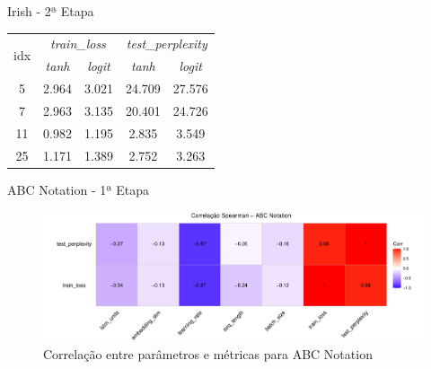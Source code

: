 \documentclass[xcolor=table]{beamer}
\begin{document}
    \begin{frame}{Irish - 2ª Etapa}
        \large
        \begin{table}
            \centering
            \begin{tabular}{c|cc|cc}
                \toprule
                \multirow{2}{*}{idx} &
                \multicolumn{2}{c|}{\textit{train\_loss}} &
                \multicolumn{2}{c}{\textit{test\_perplexity}} \\
                & {\textit{tanh}} & {\textit{logit}} & {\textit{tanh}} & {\textit{logit}} \\
                \midrule
                5 & 2.964 & 3.021 & 24.709 & 27.576 \\
                7 & 2.963 & 3.135 & 20.401 & 24.726 \\
                11 & 0.982 & 1.195 & 2.835 & 3.549 \\
                25 & 1.171 & 1.389 & 2.752 & 3.263 \\
                \bottomrule
            \end{tabular}
        \end{table}
    \end{frame}

    \begin{frame}{ABC Notation - 1ª Etapa}
        \begin{figure}
            \includegraphics[scale=0.38]{figuras/abcnotation_tanh_corr.pdf}
            \caption{Correlação entre parâmetros e métricas para ABC Notation}
        \end{figure}
    \end{frame}
\end{document}
